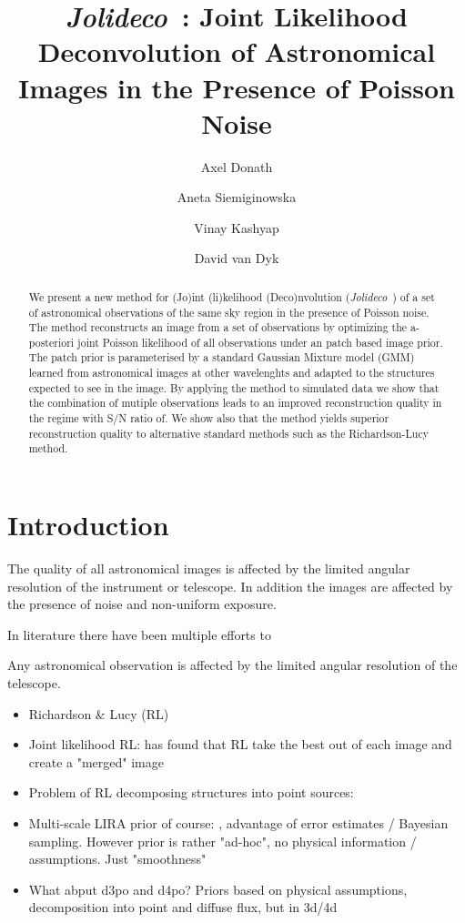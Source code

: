 \documentclass[twocolumn]{aastex631}
\newcommand{\jolideco}{\textit{Jolideco}~}
\begin{document}
    \title{\jolideco: Joint Likelihood Deconvolution of Astronomical Images in the Presence of Poisson Noise}

    \author[0000-0003-4568-7005]{Axel Donath}
    \author[0000-0002-0905-7375]{Aneta Siemiginowska}
    \author[0000-0002-3869-7996]{Vinay Kashyap}
    \author[0000-0000-0000-0000]{David van Dyk}


    \begin{abstract}
        We present a new method for (Jo)int (li)kelihood  (Deco)nvolution (\jolideco) of a set of astronomical observations of the same sky region in the presence of Poisson noise.
        The method reconstructs an image from a set of observations
        by optimizing the a-posteriori joint Poisson likelihood of all
        observations under an patch based image prior. The patch
        prior is parameterised by a standard Gaussian Mixture model (GMM)
        learned from astronomical images at other wavelenghts and
        adapted to the structures expected to see in the image.
        By applying the method to simulated data we show that
        the combination of mutiple observations leads to an
        improved reconstruction quality in the regime with S/N ratio of.
        We show also that the method yields superior reconstruction quality
        to alternative standard methods such as the Richardson-Lucy method.
    \end{abstract}



    \section{Introduction}
    The quality of all astronomical images is affected by the limited angular resolution of the instrument
    or telescope. In addition the images are affected by the presence of noise and non-uniform exposure.

    In literature there have been multiple efforts to 
    
    Any astronomical observation is affected by the limited angular resolution of the telescope.

    \begin{itemize}
        \item Richardson \& Lucy (RL)\cite{Richardson1972} \cite{Lucy1974}
        \item Joint likelihood RL: \cite{Ingaramo2014} has found that RL take the best out of each image and create a "merged" image
        \item  Problem of RL decomposing structures into point sources: \cite{Reeves1994} \cite{Fish1995}
        \item Multi-scale LIRA prior of course: \cite{Esch2004, Connors2011}, advantage of error estimates / Bayesian sampling. However prior is rather "ad-hoc", no physical information / assumptions. Just "smoothness"
        \item What abput d3po and d4po? Priors based on physical assumptions, decomposition into point and diffuse flux, but in 3d/4d \cite{Selig2015}\cite{Pumpe2018}
    \end{itemize}
    
\end{document}
